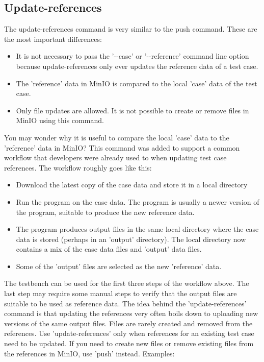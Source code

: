\documentclass{deltares_memo}
\begin{document}
\subsection{Update-references}
The update-references command is very similar to the push command. These are the most important differences:
\begin{itemize}
	\item It is not necessary to pass the '\--\--case' or '\--\--reference' command line option because update-references only ever updates the reference data of a test case.
	\item The 'reference' data in MinIO is compared to the local 'case' data of the test case.
	\item Only file updates are allowed. It is not possible to create or remove files in MinIO using this command.
\end{itemize}
You may wonder why it is useful to compare the local 'case' data to the 'reference' data in MinIO? This command was added to support a common workflow that developers were already used to when updating test case references. The workflow roughly goes like this:
\begin{itemize}
	\item Download the latest copy of the case data and store it in a local directory
	\item Run the program on the case data. The program is usually a newer version of the program, suitable to produce the new reference data.
	\item The program produces output files in the same local directory where the case data is stored (perhaps in an 'output' directory). The local directory now contains a mix of the case data files and 'output' data files.
	\item Some of the 'output' files are selected as the new 'reference' data.
\end{itemize}
The testbench can be used for the first three steps of the workflow above. The last step may require some manual steps to verify that the output files are suitable to be used as reference data. The idea behind the 'update-references' command is that updating the references very often boils down to uploading new versions of the same output files. Files are rarely created and removed from the references. Use 'update-references' only when references for an existing test case need to be updated. If you need to create new files or remove existing files from the references in MinIO, use 'push' instead.
Examples:
\end{document}
